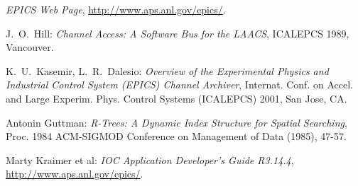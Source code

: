 
\begin{thebibliography}{99}

\emph{EPICS Web Page},
\href{http://www.aps.anl.gov/epics/}{http://www.aps.anl.gov/epics/}.

J.~O.~Hill:
\emph{Channel Access: A Software Bus for the LAACS},
ICALEPCS 1989, Vancouver.

K.~U.~Kasemir, L.~R.~Dalesio:
\emph{Overview of the Experimental Physics and Industrial Control System (EPICS) Channel Archiver},
Internat. Conf. on Accel. and Large Experim. Phys. Control Systems (ICALEPCS) 2001, San Jose, CA.

Antonin Guttman:
\emph{R-Trees: A Dynamic Index Structure for Spatial Searching},
Proc. 1984 ACM-SIGMOD Conference on Management of Data (1985), 47-57.

Marty Kraimer et al:
\emph{IOC Application Developer's Guide R3.14.4},
\href{http://www.aps.anl.gov/epics/}{http://www.aps.anl.gov/epics/}.

\end{thebibliography}
